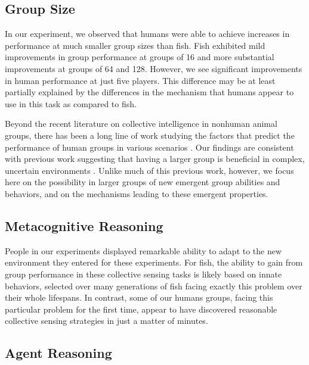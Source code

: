 \documentclass[12pt,letterpaper]{article}
\begin{document}
\subsection{Group Size}

In our experiment, we observed that humans were able to achieve
increases in performance at much smaller group sizes than fish.  Fish
exhibited mild improvements in group performance at groups of 16 and
more substantial improvements at groups of 64 and 128.  However, we
see significant improvements in human performance at just five
players.  This difference may be at least partially explained by the
differences in the mechanism that humans appear to use in this task as
compared to fish.

Beyond the recent literature on collective intelligence in nonhuman
animal groups, there has been a long line of work studying the factors
that predict the performance of human groups in various scenarios
\cite{kerr_group_2004}.  Our findings are consistent with previous
work suggesting that having a larger group is beneficial in complex,
uncertain environments \cite{stewart_meta-analytic_2006}.  Unlike much
of this previous work, however, we focus here on the possibility in
larger groups of new emergent group abilities and behaviors, and on
the mechanisms leading to these emergent properties.

\subsection{Metacognitive Reasoning}

People in our experiments displayed remarkable ability to adapt to the new environment they entered for these experiments. For fish, the ability to
gain from group performance in these collective sensing tasks is
likely based on innate behaviors, selected over many generations of
fish facing exactly this problem over their whole lifespans.  In
contrast, some of our humans groups, facing this particular problem
for the first time, appear to have discovered reasonable collective
sensing strategies in just a matter of minutes.


\subsection{Agent Reasoning}
\end{document}
